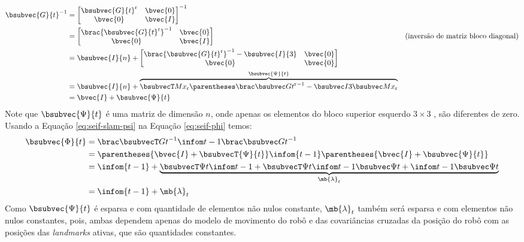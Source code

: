 \begin{equation}
\begin{aligned}
  \bsubvec{G}{t}^{-1} &= \begin{bmatrix}
    \bsubvec{G}{t}^\mathrm{r} & \bvec{0} \\
    \bvec{0} & \bvec{I}
  \end{bmatrix}^{-1} \\
  &= \begin{bmatrix}
    \brac{\bsubvec{G}{t}^\mathrm{r}}^{-1} & \bvec{0} \\
    \bvec{0} & \bvec{I} 
  \end{bmatrix} & \text{(inversão de matriz bloco diagonal)} \\
  &= \bsubvec{I}{n} + \begin{bmatrix}
    \brac{\bsubvec{G}{t}^\mathrm{r}}^{-1} - \bsubvec{I}{3} & \bvec{0} \\
    \bvec{0} & \bvec{0}
  \end{bmatrix} \\
  &= \bsubvec{I}{n} + \overbrace{\psitvalue}^{\bsubvec{\Psi}{t}} \\
  &= \bvec{I} + \bsubvec{\Psi}{t} 
\end{aligned}
\label{eq:seif-slam-psi}
\end{equation}
Note que $\bsubvec{\Psi}{t}$ é uma matriz de dimensão $n$, onde apenas os 
elementos do bloco superior esquerdo $3\times 3$ , são diferentes de zero. Usando a Equação \ref{eq:seif-slam-psi} na Equação \ref{eq:seif-phi} temos:
\begin{equation}
\begin{aligned}
  \bsubvec{\Phi}{t} &= \seifPhi \\
  &= \parentheses{\bvec{I} + \bsubvecT{\Psi}{t}} \infom{t-1} \parentheses{\bvec{I} + \bsubvec{\Psi}{t}} \\
  &= \infom{t-1} + \underbrace{\lambdatvalue}_{\mb{\lambda}_t} \\
  &= \infom{t-1} + \mb{\lambda}_t
\end{aligned}
\end{equation}
Como $\bsubvec{\Psi}{t}$ é esparsa e com quantidade de elementos não nulos 
constante, $\mb{\lambda}_t$ também será esparsa e com elementos não nulos 
constantes, pois, ambas dependem apenas do modelo de movimento do robô e das 
covariâncias cruzadas da posição do robô com as posições das 
\textit{landmarks} ativas, que são quantidades constantes.

